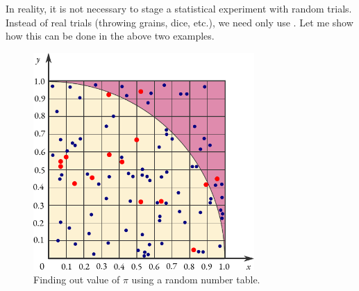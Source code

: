 In reality, it is not necessary to stage a statistical experiment with
random trials. Instead of real trials (throwing grains, dice, etc.), we need
only use . Let me show how this can be done in
the above two examples.
 \begin{figure}[!h]
 \centering
 \includegraphics[width=0.75\textwidth]{figures/monte-carlo2.pdf}
\caption{Finding out value of $\pi$ using a random number table.\label{monte-carlo2}}
 \end{figure}
 

